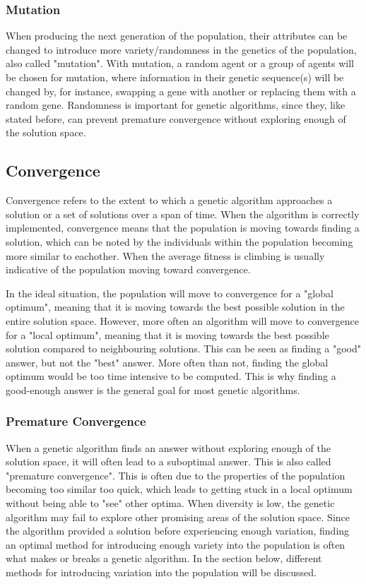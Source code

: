 \documentclass{article}
\begin{document}
\subsubsection{Mutation}
When producing the next generation of the population, their attributes can be changed to introduce more variety/randomness in the genetics of the population, also called "mutation". With mutation, a random agent or a group of agents will be chosen for mutation, where information in their genetic sequence(s) will be changed by, for instance, swapping a gene with another or replacing them with a random gene. Randomness is important for genetic algorithms, since they, like stated before, can prevent premature convergence without exploring enough of the solution space.

\bigskip
\subsection{Convergence}
Convergence refers to the extent to which a genetic algorithm approaches a solution or a set of solutions over a span of time.
When the algorithm is correctly implemented, convergence means that the population is moving towards finding a solution, which can be noted by the individuals within the population becoming more similar to eachother. When the average fitness is climbing is usually indicative of the population moving toward convergence.

\smallbreak
In the ideal situation, the population will move to convergence for a "global optimum", meaning that it is moving towards the best possible solution in the entire solution space. However, more often an algorithm will move to convergence for a "local optimum", meaning that it is moving towards the best possible solution compared to neighbouring solutions. This can be seen as finding a "good" answer, but not the "best" answer. More often than not, finding the global optimum would be too time intensive to be computed. This is why finding a good-enough answer is the general goal for most genetic algorithms.

\bigskip
\subsubsection{Premature Convergence}
When a genetic algorithm finds an answer without exploring enough of the solution space, it will often lead to a suboptimal answer. This is also called "premature convergence". This is often due to the properties of the population becoming too similar too quick, which leads to getting stuck in a local optimum without being able to "see" other optima. When diversity is low, the genetic algorithm may fail to explore other promising areas of the solution space. \smallbreak Since the algorithm provided a solution before experiencing enough variation, finding an optimal method for introducing enough variety into the population is often what makes or breaks a genetic algorithm. In the section below, different methods for introducing variation into the population will be discussed.  
\end{document}
